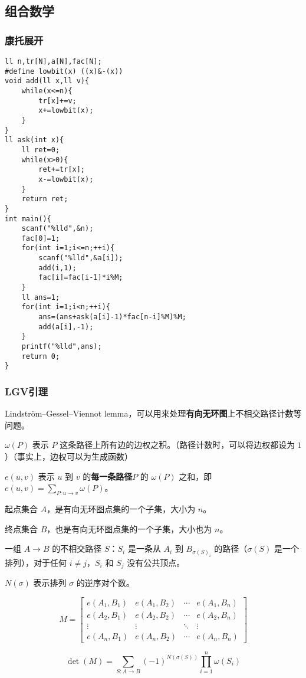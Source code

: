 \documentclass[UTF8]{ctexart}
\begin{document}
\subsection{组合数学}
\subsubsection{康托展开}
\begin{lstlisting}
ll n,tr[N],a[N],fac[N];
#define lowbit(x) ((x)&-(x))
void add(ll x,ll v){
	while(x<=n){
		tr[x]+=v;
		x+=lowbit(x);
	}
}
ll ask(int x){
	ll ret=0;
	while(x>0){
		ret+=tr[x];
		x-=lowbit(x);
	}
	return ret;
}
int main(){
	scanf("%lld",&n);
	fac[0]=1;
	for(int i=1;i<=n;++i){
		scanf("%lld",&a[i]);
		add(i,1);
		fac[i]=fac[i-1]*i%M;
	}
	ll ans=1;
	for(int i=1;i<n;++i){
		ans=(ans+ask(a[i]-1)*fac[n-i]%M)%M;
		add(a[i],-1);
	}
	printf("%lld",ans);
	return 0;
} 
\end{lstlisting}
\subsubsection{LGV引理}
Lindström–Gessel–Viennot lemma，可以用来处理\textbf{有向无环图}上不相交路径计数等问题。

$\omega(P)$ 表示 $P$ 这条路径上所有边的边权之积。（路径计数时，可以将边权都设为 $1$）（事实上，边权可以为生成函数）

$e(u, v)$ 表示 $u$ 到 $v$ 的\textbf{每一条路径}$P$ 的 $\omega(P)$ 之和，即 $e(u, v)=\sum\limits_{P:u\rightarrow v}\omega(P)$。

起点集合 $A$，是有向无环图点集的一个子集，大小为 $n$。

终点集合 $B$，也是有向无环图点集的一个子集，大小也为 $n$。

一组 $A\rightarrow B$ 的不相交路径 $S$：$S_i$ 是一条从 $A_i$ 到 $B_{\sigma(S)_i}$ 的路径（$\sigma(S)$ 是一个排列），对于任何 $i\ne j$，$S_i$ 和 $S_j$ 没有公共顶点。

$N(\sigma)$ 表示排列 $\sigma$ 的逆序对个数。

$$
M = \begin{bmatrix}e(A_1,B_1)&e(A_1,B_2)&\cdots&e(A_1,B_n)\\
e(A_2,B_1)&e(A_2,B_2)&\cdots&e(A_2,B_n)\\
\vdots&\vdots&\ddots&\vdots\\
e(A_n,B_1)&e(A_n,B_2)&\cdots&e(A_n,B_n)\end{bmatrix}
$$

$$
\det(M)=\sum\limits_{S:A\rightarrow B}(-1)^{N(\sigma(S))}\prod\limits_{i=1}^n \omega(S_i)
$$
\end{document}
